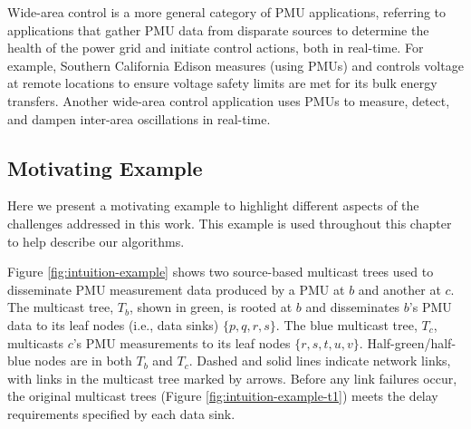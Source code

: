 Wide-area control is a more general category of PMU applications, referring to applications that gather PMU data from disparate sources to determine the health of the power grid 
and initiate control actions, both in real-time.
For example, Southern California Edison \cite{Johnson07} measures (using PMUs) and controls voltage at remote locations to ensure voltage safety limits are met for its bulk energy transfers.
Another wide-area control application uses PMUs to measure, detect, and dampen inter-area oscillations in real-time\cite{Bakken11}.





\subsection{Motivating Example}
\label{subsec:problem-scenario}

Here we present a motivating example to highlight different aspects of the challenges addressed in this work.  This example is used throughout this chapter to help describe our algorithms.

Figure \ref{fig:intuition-example} shows two source-based multicast trees used to disseminate PMU measurement data produced by a PMU at $b$ and another at $c$. The multicast tree, $T_b$, shown in green, 
is rooted at $b$ and disseminates $b$'s PMU data to its leaf nodes (i.e., data sinks) $\{p,q,r,s\}$. The blue multicast tree, $T_c$, multicasts $c$'s PMU measurements to its
leaf nodes $\{r,s,t,u,v\}$.  %
Half-green/half-blue nodes are in both $T_b$ and $T_c$.   Dashed and solid lines indicate network links, with links in the multicast tree marked by arrows.
Before any link failures occur, the original multicast trees (Figure \ref{fig:intuition-example-t1}) meets the delay requirements specified by each data sink.  

